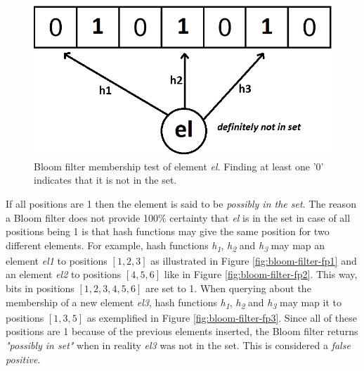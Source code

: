 \begin{figure}[!htb]
    \begin{center}
      \includegraphics[scale=0.4]{figures/query-bloom.png}
      \caption[Bloom filter membership query]{Bloom filter membership test of element \textit{el}. Finding at least one '0' indicates that it is not in the set.}
      \label{fig:bloom-filter}
    \end{center}
\end{figure}

If all positions are 1 then the element is said to be \textit{possibly in the set}. The reason a Bloom filter does not provide 100\% certainty that \textit{el} is in the set in case of all positions being 1 is that hash functions may give the same position for two different elements. For example, hash functions \textit{h\textsubscript{1}}, \textit{h\textsubscript{2}} and \textit{h\textsubscript{3}} may map an element \textit{el1} to positions $[1,2,3]$ as illustrated in Figure \ref{fig:bloom-filter-fp1} and an element \textit{el2} to positions $[4,5,6]$ like in Figure \ref{fig:bloom-filter-fp2}. This way, bits in positions $[1,2,3,4,5,6]$ are set to 1. When querying about the membership of a new element \textit{el3}, hash functions \textit{h\textsubscript{1}}, \textit{h\textsubscript{2}} and \textit{h\textsubscript{3}} may map it to positions $[1,3,5]$ as exemplified in Figure \ref{fig:bloom-filter-fp3}. Since all of these positions are 1 because of the previous elements inserted, the Bloom filter returns \textit{"possibly in set"} when in reality \textit{el3} was not in the set. This is considered a \textit{false positive}.


